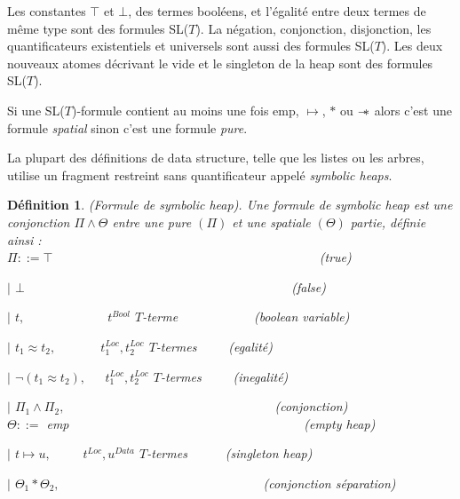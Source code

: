 \documentclass[9pt,openany]{book}
\newcommand\sepimp{\mathrel{-\mkern-6mu*}}
\newtheorem{definition}{D\'efinition}[section]
\begin{document}
	Les constantes $\top$ et $\bot$, des termes bool\'eens, et l'\'egalit\'e entre deux termes de m\^eme type sont des formules SL($T$). La n\'egation, conjonction, disjonction, les quantificateurs existentiels et universels sont aussi des formules SL($T$).
	Les deux nouveaux atomes d\'ecrivant le vide et le singleton de la heap sont des formules SL($T$).\par
	Si une SL($T$)-formule contient au moins une fois emp, $\mapsto$, $*$ ou $\sepimp$ alors c'est une formule \textit{spatial} sinon c'est une formule \textit{pure}.\par
	La plupart des d\'efinitions de data structure, telle que les listes ou les arbres, utilise un fragment restreint sans quantificateur appel\'e \textit{symbolic heaps}.
\begin{definition}
(Formule de symbolic heap). Une formule de \textit{symbolic heap} est une conjonction $\Pi\land\Theta$ entre une pure $(\Pi)$ et une spatiale $(\Theta)$ partie, d\'efinie ainsi :\\
$\Pi ::= \top$~~~~~~~~~~~~~~~~~~~~~~~~~~~~~~~~~~~~~~~~~~(true)\par
$|$ $\bot$~~~~~~~~~~~~~~~~~~~~~~~~~~~~~~~~~~~~~~~~~~(false)\par
$|$ $t,$~~~~~~~~~~~~~$t^{Bool}$ $T$-terme~~~~~~~~~~~~(boolean variable)\par
$|$ $t_{1}\approx t_{2},$~~~~~~~$t^{Loc}_{1},t^{Loc}_{2}$ $T$-termes~~~~~(egalit\'e)\par
$|$ $\neg(t_{1}\approx t_{2}),$~~~$t^{Loc}_{1},t^{Loc}_{2}$ $T$-termes~~~~~(inegalit\'e)\par
$|$ $\Pi_{1}\land\Pi_{2},$~~~~~~~~~~~~~~~~~~~~~~~~~~~~~~~~~(conjonction)\\
$\Theta ::=$ emp~~~~~~~~~~~~~~~~~~~~~~~~~~~~~~~~~~~~~(empty heap)\par
$|$ $t\mapsto u,$~~~~~$t^{Loc},u^{Data}$ $T$-termes~~~~~~(singleton heap)\par
$|$ $\Theta_{1}*\Theta_{2},$~~~~~~~~~~~~~~~~~~~~~~~~~~~~~~~~(conjonction s\'eparation)
\end{definition}
\end{document}
